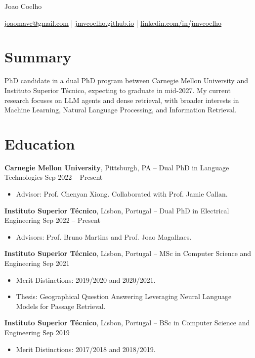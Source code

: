 \documentclass[11pt]{article}       %
\begin{document}
\centerline{\Huge Joao Coelho}

\vspace{3pt}

\centerline{\href{mailto:joaomavc@gmail.com}{joaomavc@gmail.com} | \href{https://jmvcoelho.github.io}{jmvcoelho.github.io} | \href{https://www.linkedin.com/in/jmvcoelho/}{linkedin.com/in/jmvcoelho}}

\section*{Summary}
PhD candidate in a dual PhD program between Carnegie Mellon University and Instituto Superior Técnico, expecting to graduate in mid-2027. My current research focuses on LLM agents and dense retrieval, with broader interests in Machine Learning, Natural Language Processing, and Information Retrieval.


\section*{Education}
\textbf{Carnegie Mellon University}, Pittsburgh, PA -- Dual PhD in Language Technologies \hfill Sep 2022 -- Present
\begin{itemize}
  \item Advisor: Prof. Chenyan Xiong. Collaborated with Prof. Jamie Callan.
\end{itemize}

\textbf{Instituto Superior Técnico}, Lisbon, Portugal -- Dual PhD in Electrical Engineering \hfill Sep 2022 -- Present
\begin{itemize}
  \item Advisors: Prof. Bruno Martins and Prof. Joao Magalhaes.
\end{itemize}

\textbf{Instituto Superior Técnico}, Lisbon, Portugal -- MSc in Computer Science and Engineering \hfill Sep 2021
\begin{itemize}
  \item Merit Distinctions: 2019/2020 and 2020/2021.
  \item Thesis: Geographical Question Answering Leveraging Neural Language Models for Passage Retrieval.
\end{itemize}

\textbf{Instituto Superior Técnico}, Lisbon, Portugal -- BSc in Computer Science and Engineering \hfill Sep 2019
\begin{itemize}
  \item Merit Distinctions: 2017/2018 and 2018/2019.
\end{itemize}
\end{document}
